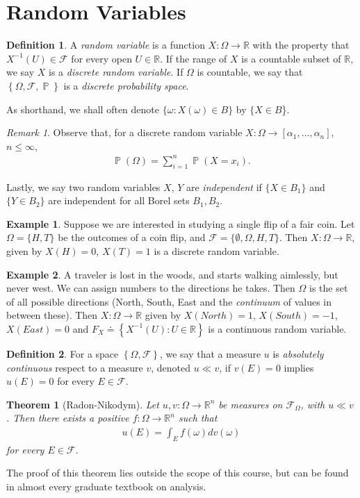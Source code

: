 \documentclass[12pt]{amsbook}
\newcommand{\rr}{\mathbb{R}}
\newcommand{\filter}{\mathcal{F}}
\DeclareMathOperator{\prob}{\mathbb{P}}
\theoremstyle{plain}
\newtheorem{theorem}{Theorem}
\theoremstyle{definition}
\newtheorem*{definition}{Definition}
\newtheorem*{example}{Example}
\theoremstyle{remark}
\newtheorem*{remark}{Remark}
\numberwithin{equation}{section}  %
\begin{document}
\section{Random Variables} 
\begin{definition}
	A \emph{random variable} is a function $X: \Omega \to \rr$ with the property
	that $X^{-1}(U) \in \filter$ for every open $U \in \rr$. If the range of $X$
	is a countable subset of $\rr$, we say $X$
	is a \emph{discrete random variable}. If $\Omega$ is countable, we say that 
	$\left\{ \Omega, \filter, \prob \right\}$ is a \emph{discrete probability 
	space}.
\end{definition}
As shorthand, we shall often denote $\{\omega: X(\omega) \in B\}$ by
$\{X \in B$\}.
\begin{remark}
	Observe that, for a discrete random variable $X: \Omega \to [\alpha_1,
	\ldots, \alpha_n]$,  $n \le \infty$, 
	\begin{align*}
		\prob(\Omega) = \sum_{i =1}^n \prob(X = x_i).
	\end{align*}
\end{remark}
Lastly, we say two random variables $X$, $Y$ are \emph{independent} if
$\{X \in B_1\}$ and $\{Y \in B_2\}$ are independent for all Borel sets
$B_1, B_2$. 
\begin{example}
	Suppose we are interested in studying a single flip of a fair coin.
	Let
	$\Omega = \{H, T\}$ be the outcomes of a coin flip, and
	$\filter = \{\emptyset, \Omega, H, T \}$. Then $X: \Omega \to \rr$, given by
	$X(H) = 0$, $X(T) = 1$ is a discrete random variable.
\end{example}
\begin{example}
	A traveler is lost in the woods, and starts walking aimlessly, but never
	west. 
	We can assign numbers to the directions he takes. 
	Then $\Omega$ is the set of all possible directions (North, South, East
	and the \emph{continuum} of values in between these). Then
	$X: \Omega \to \rr$ given by $X(North) = 1$, $X(South) = -1$, $X(East) = 0$
	and $F_{X} \doteq \left\{ X^{-1}(U): U \in \rr \right\}$ is a continuous 
	random
	variable.
\end{example}
\begin{definition}
	For a space $\left\{ \Omega, \filter \right\}$, we say that a measure $u$ is
	\emph{absolutely continuous} respect to a measure $v$, denoted $u \ll v$, if
	$v(E) = 0$ implies $u(E) = 0$ for every $E \in \filter$.
\end{definition}
\begin{theorem}[Radon-Nikodym]
	Let $u,v: \Omega \to \rr^n$ be measures on $\filter_{\Omega}$, with $u \ll 
	v$.
	Then there exists a positive $f: \Omega \to \rr^n$ such that
	\begin{align*}
		u(E) = \int_{E} f(\omega) dv(\omega)
	\end{align*}
	for every $E \in \filter$.
\end{theorem}
The proof of this theorem lies outside the scope of this course, but can be
found in almost every graduate textbook on analysis. 
\end{document}
